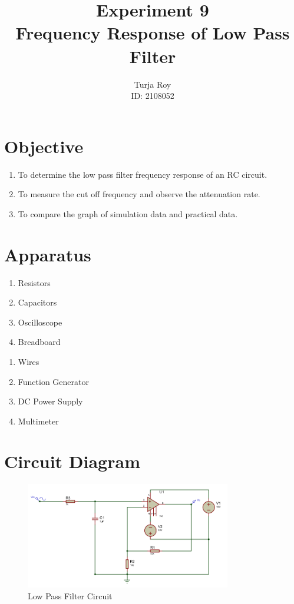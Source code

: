 \documentclass[12pt]{article}
\title{
    \textbf{Experiment 9} \\
    \textbf{Frequency Response of Low Pass Filter}
}
\author{
    Turja Roy \\
    ID: 2108052
}
\date{}
\begin{document}
\maketitle

\section{Objective}
\begin{enumerate}
    \item To determine the low pass filter frequency response of an RC circuit.
    \item To measure the cut off frequency and observe the attenuation rate.
    \item To compare the graph of simulation data and practical data.
\end{enumerate}

\section{Apparatus}
\begin{multicols}{2}
    \begin{enumerate}
        \item Resistors
        \item Capacitors
        \item Oscilloscope
        \item Breadboard
    \end{enumerate}
    \columnbreak
    \begin{enumerate}
        \item Wires
        \item Function Generator
        \item DC Power Supply
        \item Multimeter
    \end{enumerate}
\end{multicols}

\section{Circuit Diagram}
\begin{figure}[h]
    \centering
    \includegraphics[width=0.8\textwidth]{LPF.png}
    \caption{Low Pass Filter Circuit}
\end{figure}
\end{document}
